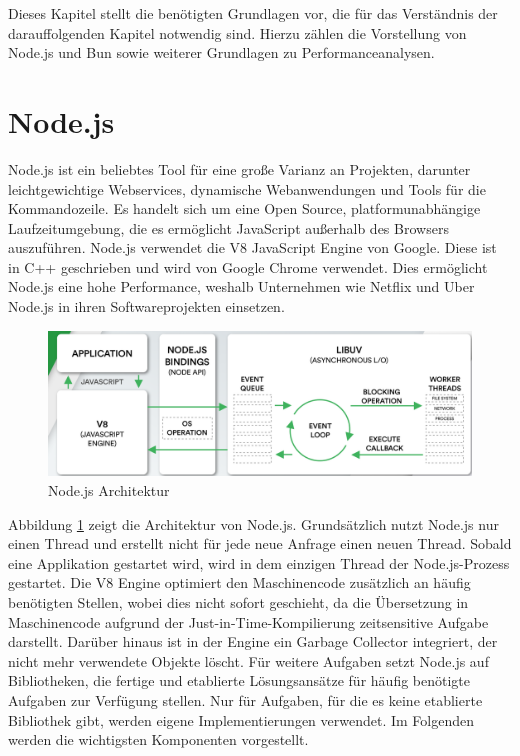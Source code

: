  \label{foundations}
Dieses Kapitel stellt die benötigten Grundlagen vor, die für das Verständnis der darauffolgenden Kapitel notwendig sind. Hierzu zählen die Vorstellung von Node.js und Bun sowie weiterer Grundlagen zu Performanceanalysen.

\section{Node.js} \label{sec:foundations-Node.js}
Node.js ist ein beliebtes Tool für eine große Varianz an Projekten, darunter leichtgewichtige Webservices, dynamische Webanwendungen und Tools für die Kommandozeile. Es handelt sich um eine Open Source, platformunabhängige Laufzeitumgebung, die es ermöglicht JavaScript außerhalb des Browsers auszuführen. Node.js verwendet die V8 JavaScript Engine von Google. Diese ist in C++ geschrieben und wird von Google Chrome verwendet. Dies ermöglicht Node.js eine hohe Performance, weshalb Unternehmen wie Netflix und Uber Node.js in ihren Softwareprojekten einsetzen. \cite{OpenJSFoundation.2022} \\

\begin{figure}[h]
	\centering
	\includegraphics[width=\linewidth]{./images/NodeJsArchitecture}
	\caption[Node.js Architektur]{Node.js Architektur \cite{Kaneriya.2022}}
	\label{fig:nodejsArchitecture}
\end{figure}
 
\noindent
Abbildung \ref{fig:nodejsArchitecture} zeigt die Architektur von Node.js. Grundsätzlich nutzt Node.js nur einen Thread und erstellt nicht für jede neue Anfrage einen neuen Thread. Sobald eine Applikation gestartet wird, wird in dem einzigen Thread der Node.js-Prozess gestartet. Die V8 Engine optimiert den Maschinencode zusätzlich an häufig benötigten Stellen, wobei dies nicht sofort geschieht, da die Übersetzung in Maschinencode aufgrund der Just-in-Time-Kompilierung zeitsensitive Aufgabe darstellt. Darüber hinaus ist in der Engine ein Garbage Collector integriert, der nicht mehr verwendete Objekte löscht.  \cite{Springer.2022} \newline 
Für weitere Aufgaben setzt Node.js auf Bibliotheken, die fertige und etablierte Lösungsansätze für häufig benötigte Aufgaben zur Verfügung stellen. Nur für Aufgaben, für die es keine etablierte Bibliothek gibt, werden eigene Implementierungen verwendet. Im Folgenden werden die wichtigsten Komponenten vorgestellt. \cite{Springer.2022} \\

